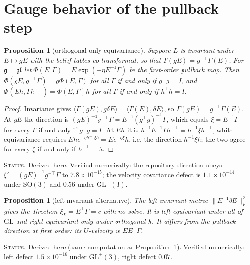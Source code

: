 \documentclass[11pt]{article}
\newtheorem{proposition}[theorem]{Proposition}
\theoremstyle{definition}
\theoremstyle{remark}
\newcommand{\g}{\mathfrak{g}}
\newcommand{\gl}{\mathfrak{gl}}
\newcommand{\GL}{\mathrm{GL}}
\newcommand{\ip}[2]{\langle #1, #2\rangle}
\newcommand{\status}[1]{\par\smallskip\noindent\textsc{Status.} #1\par\smallskip}
\begin{document}
\section{Gauge behavior of the pullback step}\label{sec:gauge-pullback}

\begin{proposition}[orthogonal-only equivariance]\label{prop:orth}
Suppose $L$ is invariant under $E\mapsto gE$ with the belief tables co-transformed, so that $\Gamma(gE)=g^{-\top}\Gamma(E)$. For $\g=\gl$ let $\Phi(E,\Gamma)=E\exp(-\eta E^{-1}\Gamma)$ be the first-order pullback map. Then $\Phi(gE,g^{-\top}\Gamma)=g\Phi(E,\Gamma)$ for all $\Gamma$ if and only if $g^\top g=I$, and $\Phi(Eh,\Gamma h^{-\top})=\Phi(E,\Gamma)h$ for all $\Gamma$ if and only if $h^\top h=I$.
\end{proposition}
\begin{proof}
Invariance gives $\ip{\Gamma(gE)}{g\delta E}=\ip{\Gamma(E)}{\delta E}$, so $\Gamma(gE)=g^{-\top}\Gamma(E)$. At $gE$ the direction is $(gE)^{-1}g^{-\top}\Gamma=E^{-1}(g^\top g)^{-1}\Gamma$, which equals $\xi=E^{-1}\Gamma$ for every $\Gamma$ if and only if $g^\top g=I$. At $Eh$ it is $h^{-1}E^{-1}\Gamma h^{-\top}=h^{-1}\xi h^{-\top}$, while equivariance requires $Ehe^{-\eta h^{-1}\xi h}=Ee^{-\eta\xi}h$, i.e. the direction $h^{-1}\xi h$; the two agree for every $\xi$ if and only if $h^{-\top}=h$.
\end{proof}
\status{Derived here. Verified numerically: the repository direction obeys $\xi'=(gE)^{-1}g^{-\top}\Gamma$ to $7.8\times10^{-15}$; the velocity covariance defect is $1.1\times10^{-14}$ under $\mathrm{SO}(3)$ and $0.56$ under $\GL^+(3)$.}

\begin{proposition}[left-invariant alternative]\label{prop:leftinv}
The left-invariant metric $\|E^{-1}\delta E\|_F^2$ gives the direction $\xi_L=E^\top\Gamma=c$ with no solve. It is left-equivariant under all of $\GL$ and right-equivariant only under orthogonal $h$. It differs from the pullback direction at first order: its $U$-velocity is $EE^\top\Gamma$.
\end{proposition}
\status{Derived here (same computation as Proposition~\ref{prop:orth}). Verified numerically: left defect $1.5\times10^{-16}$ under $\GL^+(3)$, right defect $0.07$.}
\end{document}
